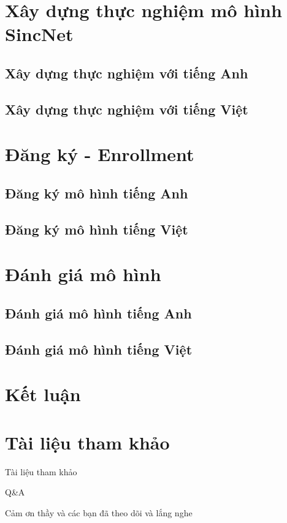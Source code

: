 \documentclass[notheorems, aspectratio=54]{beamer}
\begin{document}
\section{Xây dựng thực nghiệm mô hình SincNet}
\subsection{Xây dựng thực nghiệm với tiếng Anh}
\begin{frame}
\end{frame}
\subsection{Xây dựng thực nghiệm với tiếng Việt}
\begin{frame}
\end{frame}
\section{Đăng ký - Enrollment}
\subsection{Đăng ký mô hình tiếng Anh}
\begin{frame}
\end{frame}
\subsection{Đăng ký mô hình tiếng Việt}
\begin{frame}
\end{frame}
\section{Đánh giá mô hình}
\subsection{Đánh giá mô hình tiếng Anh}
\begin{frame}
\end{frame}
\subsection{Đánh giá mô hình tiếng Việt}
\begin{frame}
\end{frame}
\section{Kết luận}

\section{Tài liệu tham khảo}
\begin{frame}{Tài liệu tham khảo}
	\nocite{*}
	\newpage\cleardoublepage
	
\end{frame}


\begin{frame}{Q\&A}
	\begin{center}
		\Huge Cảm ơn thầy và các bạn đã theo dõi và lắng nghe
	\end{center}
\end{frame}
\end{document}
